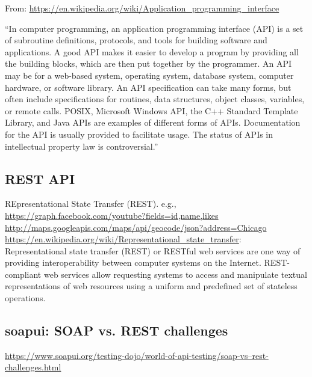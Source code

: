 \documentclass[11pt]{article}
\begin{document}
From: 
\href{https://en.wikipedia.org/wiki/Application\_programming\_interface}{https://en.wikipedia.org/wiki/Application\_programming\_interface}

\noindent
``In computer programming, an application programming interface (API) is a set of subroutine definitions, protocols, and tools for building software and applications. A good API makes it easier to develop a program by providing all the building blocks, which are then put together by the programmer. An API may be for a web-based system, operating system, database system, computer hardware, or software library. An API specification can take many forms, but often include specifications for routines, data structures, object classes, variables, or remote calls. POSIX, Microsoft Windows API, the C++ Standard Template Library, and Java APIs are examples of different forms of APIs. Documentation for the API is usually provided to facilitate usage. The status of APIs in intellectual property law is controversial.''


\subsection{REST API}
REpresentational State Transfer (REST). 
e.g.,\\
\href{https://graph.facebook.com/youtube?fields=id,name,likes}{https://graph.facebook.com/youtube?fields=id,name,likes}\\
\href{http://maps.googleapis.com/maps/api/geocode/json?address=Chicago}{http://maps.googleapis.com/maps/api/geocode/json?address=Chicago}\\

\href{https://en.wikipedia.org/wiki/Representational_state_transfer}{https://en.wikipedia.org/wiki/Representational\_state\_transfer}: \\
Representational state transfer (REST) or RESTful web services are one way of providing interoperability between computer systems on the Internet. REST-compliant web services allow requesting systems to access and manipulate textual representations of web resources using a uniform and predefined set of stateless operations.



    \subsection{soapui: SOAP vs. REST challenges}
\href{https://www.soapui.org/testing-dojo/world-of-api-testing/soap-vs--rest-challenges.html}{https://www.soapui.org/testing-dojo/world-of-api-testing/soap-vs--rest-challenges.html}
\end{document}
